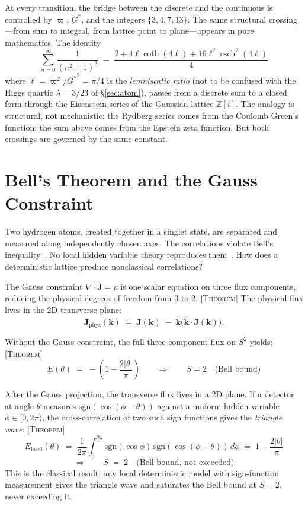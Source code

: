 \documentclass[12pt]{article}
\newcommand{\ZZ}{\mathbb{Z}}
\DeclareMathOperator{\csch}{csch}
\newcommand{\etag}[1]{{\normalfont\textsc{\footnotesize [#1]}}}
\theoremstyle{compact}
\begin{document}
At every transition, the bridge between the discrete and the continuous is controlled by $\varpi$, ${G^{*}}$, and the integers $\{3, 4, 7, 13\}$. The same structural crossing---from sum to integral, from lattice point to plane---appears in pure mathematics. The identity
\[
\sum_{n=0}^{\infty} \frac{1}{(n^2+1)^2} \;=\; \frac{2 + 4\ell\coth(4\ell) + 16\ell^2\csch^2(4\ell)}{4}
\]
where $\ell = \varpi^2/{G^{*}}^2 = \pi/4$ is the \emph{lemniscatic ratio} (not to be confused with the Higgs quartic $\lambda = 3/23$ of \S\ref{sec:atom}), passes from a discrete sum to a closed form through the Eisenstein series of the Gaussian lattice $\ZZ[i]$. The analogy is structural, not mechanistic: the Rydberg series comes from the Coulomb Green's function; the sum above comes from the Epstein zeta function. But both crossings are governed by the same constant.


\section{Bell's Theorem and the Gauss Constraint}
\label{sec:bell}

Two hydrogen atoms, created together in a singlet state, are separated and measured along independently chosen axes. The correlations violate Bell's inequality~\cite{bell}. No local hidden variable theory reproduces them~\cite{chsh}. How does a deterministic lattice produce nonclassical correlations?

The Gauss constraint $\nabla \cdot \mathbf{J} = \rho$ is one scalar equation on three flux components, reducing the physical degrees of freedom from 3 to 2. \etag{Theorem} The physical flux lives in the 2D transverse plane:
\[
\mathbf{J}_{\mathrm{phys}}(\mathbf{k}) \;=\; \mathbf{J}(\mathbf{k}) \;-\; \hat{\mathbf{k}}\bigl(\hat{\mathbf{k}} \cdot \mathbf{J}(\mathbf{k})\bigr).
\]

Without the Gauss constraint, the full three-component flux on $S^2$ yields: \etag{Theorem}
\[
E(\theta) \;=\; -\!\left(1 - \frac{2|\theta|}{\pi}\right) \qquad \Longrightarrow \qquad S = 2 \quad \text{(Bell bound)}
\]

After the Gauss projection, the transverse flux lives in a 2D plane. If a detector at angle $\theta$ measures $\mathrm{sgn}(\cos(\phi - \theta))$ against a uniform hidden variable $\phi \in [0, 2\pi)$, the cross-correlation of two such sign functions gives the \emph{triangle wave}: \etag{Theorem}
\[
E_{\mathrm{local}}(\theta) \;=\; \frac{1}{2\pi}\int_0^{2\pi} \mathrm{sgn}(\cos\phi)\,\mathrm{sgn}(\cos(\phi-\theta))\,d\phi \;=\; 1 - \frac{2|\theta|}{\pi}
\]
\[
\Longrightarrow \qquad S \;=\; 2 \quad \text{(Bell bound, not exceeded)}
\]
This is the classical result: any local deterministic model with sign-function measurement gives the triangle wave and saturates the Bell bound at $S = 2$, never exceeding it.
\end{document}
